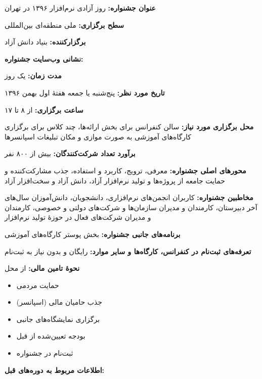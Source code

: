 \documentclass{article}
\begin{document}
\begin{flushright}
\textbf{عنوان جشنواره:} روز آزادی نرم‌افزار ۱۳۹۶ در تهران

\textbf{سطح برگزاری:}  ملی  منطقه‌ای  بین‌المللی

\textbf{برگزارکننده:} بنیاد دانش آزاد

\textbf{نشانی وب‌سایت جشنواره:‌} 

\textbf{مدت زمان:} یک روز

\textbf{تاریخ مورد نظر:} پنج‌شنبه یا جمعه هفتهٔ اول بهمن ۱۳۹۶

\textbf{ساعت برگزاری:} از ۸ تا ۱۷

\textbf{محل برگزاری مورد نیاز:} سالن کنفرانس برای بخش ارائه‌ها، چند کلاس برای برگزاری کارگاه‌های آموزشی به صورت موازی و مکان تبلیغات اسپانسرها

\textbf{برآورد تعداد شرکت‌کنندگان:} بیش از ۸۰۰ نفر

\textbf{محورهای اصلی جشنواره:} معرفی، ترویج، کاربرد و استفاده، جذب مشارکت‌کننده و حمایت جامعه از پروژه‌ها و تولید نرم‌افزار آزاد، دانش آزاد و سخت‌افزار آزاد

\textbf{مخاطبین جشنواره:} کاربران انجمن‌های نرم‌افزاری، دانشجویان، دانش‌آموزان سال‌های آخر دبیرستان، کارمندان و مدیران سازمان‌ها و شرکت‌های دولتی و خصوصی، کارمندان و مدیران شرکت‌های فعال در حوزهٔ تولید نرم‌افزار

\textbf{برنامه‌های جانبی جشنواره:}  بخش پوستر  کارگاه‌های آموزشی

\textbf{تعرفه‌های ثبت‌نام در کنفرانس، کارگاه‌ها و سایر موارد:} رایگان و بدون نیاز به ثبت‌نام

\textbf{نحوهٔ تامین مالی:} از محل

\begin{itemize}
\item[]  حمایت مردمی
\item[]  جذب حامیان مالی (اسپانسر)
\item[]  برگزاری نمایشگاه‌های جانبی
\item[]  بودجه تعیین‌شده از قبل
\item[]  ثبت‌نام در جشنواره
\end{itemize}
\clearpage

\textbf{اطلاعات مربوط به دوره‌های قبل:}


\end{flushright}
\end{document}
